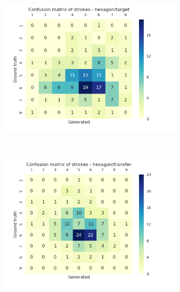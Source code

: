       \begin{figure}\ContinuedFloat

        \begin{subfigure}[tb]{0.45\textwidth}
            \includegraphics[width=\textwidth]{images/sota/quickdraw_results/quickdraw_hexagon_target_strokes_heatmap.png}
        \end{subfigure}
        ~
        \begin{subfigure}[tb]{0.45\textwidth}
            \includegraphics[width=\textwidth]{images/sota/quickdraw_results/quickdraw_hexagon_transfer_strokes_heatmap.png}
        \end{subfigure}


\end{figure}
